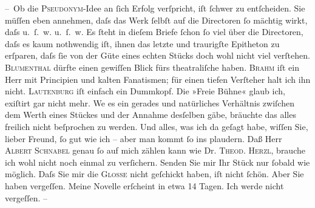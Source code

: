\pstart
           – Ob die \textsc{Pseudonym}-Idee an{ }ſich Erfolg verſpricht, iſt{ }ſchwer zu entſcheiden. Sie müſſen eben annehmen, daſs das Werk{ }ſelbſt auf die
               Directoren{ }ſo mächtig wirkt, daſs u. ſ. w. u. ſ. w. Es{ }ſteht in dieſem Briefe{ }ſchon{ }ſo viel über die Directoren, daſs es kaum nothwendig iſt, ihnen das letzte und
               traurigſte Epitheton zu erſparen, daſs{ }ſie von der Güte eines echten Stücks doch wohl
               nicht viel verſtehen. {\pb}\textsc{Blumenthal} dürfte einen gewiſſen Blick fürs theatraliſche haben. \textsc{Brahm} iſt ein Herr mit Principien und kalten Fanatismen; für einen tiefen Verſteher
               halt ich ihn nicht. \textsc{Lautenburg} iſt einfach ein Dummkopf. Die »Freie Bühne«
               glaub ich, exiſtirt gar nicht mehr. We{\geminationn} es ein gerades
               und natürliches Verhältnis zwiſchen dem Werth eines Stückes und der Annahme desſelben
               gäbe, bräuchte das alles freilich nicht beſprochen zu werden. Und alles, was ich da
                  {\pb}geſagt habe, wiſſen Sie, lieber Freund,{ }ſo gut wie ich
               – aber man kommt{ }ſo ins plaudern. Daß Herr \textsc{Albert Schnabel}
               genau{ }ſo auf mich zählen kann wie Dr. \textsc{Theod. Herzl}, brauche
               ich wohl nicht noch einmal zu verſichern. Senden Sie mir Ihr Stück nur{ }ſobald wie möglich. Daſs Sie mir
               die \textsc{Glosse} nicht geſchickt haben, iſt nicht{ }ſchön. Aber Sie haben vergeſſen. Meine Novelle erſcheint in etwa 14
               Tagen. Ich werde nicht vergeſſen. –\pend
           
